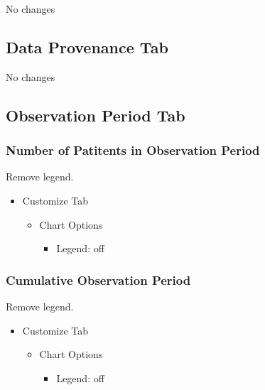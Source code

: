 \documentclass[
]{book}
\providecommand{\tightlist}{%
  \setlength{\itemsep}{0pt}\setlength{\parskip}{0pt}}
\begin{document}
No changes

\hypertarget{data-provenance-tab-1}{%
\subsection*{Data Provenance Tab}\label{data-provenance-tab-1}}

No changes

\hypertarget{observation-period-tab-1}{%
\subsection*{Observation Period Tab}\label{observation-period-tab-1}}

\hypertarget{number-of-patitents-in-observation-period-1}{%
\subsubsection*{Number of Patitents in Observation Period}\label{number-of-patitents-in-observation-period-1}}

Remove legend.

\begin{itemize}
\tightlist
\item
  Customize Tab

  \begin{itemize}
  \tightlist
  \item
    Chart Options

    \begin{itemize}
    \tightlist
    \item
      Legend: off
    \end{itemize}
  \end{itemize}
\end{itemize}

\hypertarget{cumulative-observation-period-1}{%
\subsubsection*{Cumulative Observation Period}\label{cumulative-observation-period-1}}

Remove legend.

\begin{itemize}
\tightlist
\item
  Customize Tab

  \begin{itemize}
  \tightlist
  \item
    Chart Options

    \begin{itemize}
    \tightlist
    \item
      Legend: off
    \end{itemize}
  \end{itemize}
\end{itemize}
\end{document}
